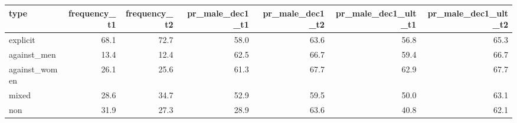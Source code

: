 
\begin{tabular}{l|r|r|r|r|r|r}
\hline
type & frequency\_t1 & frequency\_t2 & pr\_male\_dec1\_t1 & pr\_male\_dec1\_t2 & pr\_male\_dec1\_ult\_t1 & pr\_male\_dec1\_ult\_t2\\
\hline
explicit & 68.1 & 72.7 & 58.0 & 63.6 & 56.8 & 65.3\\
\hline
against\_men & 13.4 & 12.4 & 62.5 & 66.7 & 59.4 & 66.7\\
\hline
against\_women & 26.1 & 25.6 & 61.3 & 67.7 & 62.9 & 67.7\\
\hline
mixed & 28.6 & 34.7 & 52.9 & 59.5 & 50.0 & 63.1\\
\hline
non & 31.9 & 27.3 & 28.9 & 63.6 & 40.8 & 62.1\\
\hline
\end{tabular}
